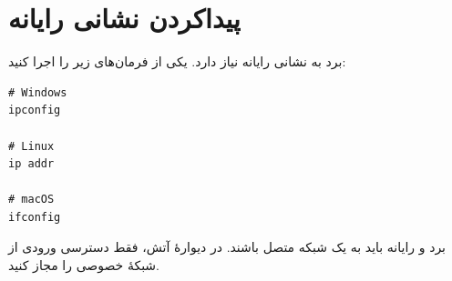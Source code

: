 \section{پیداکردن نشانی رایانه}
برد به نشانی
رایانه نیاز دارد. یکی از فرمان‌های زیر را اجرا کنید:

\begin{LTR}
\begin{lstlisting}
# Windows
ipconfig

# Linux
ip addr

# macOS
ifconfig
\end{lstlisting}
\end{LTR}

برد و رایانه باید به یک شبکه متصل باشند. در دیوارهٔ آتش، فقط دسترسی ورودی
از شبکهٔ خصوصی را مجاز کنید.
